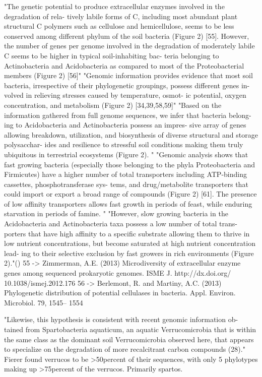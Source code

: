 "The genetic potential to produce extracellular enzymes involved in the degradation of rela- tively labile forms of C, including most abundant plant structural C polymers such as cellulose and hemicellulose, seems to be less conserved among different phylum of the soil bacteria (Figure 2) [55]. However, the number of genes per genome involved in the degradation of moderately labile C seems to be higher in typical soil-inhabiting bac- teria belonging to Actinobacteria and Acidobacteria as compared to most of the Proteobacterial members (Figure 2) [56]" "Genomic information provides evidence that most soil bacteria, irrespective of their phylogenetic groupings, possess different genes in- volved in relieving stresses caused by temperature, osmot- ic potential, oxygen concentration, and metabolism (Figure 2) [34,39,58,59]" 
"Based on the information gathered from full genome sequences, we infer that bacteria belong- ing to Acidobacteria and Actinobacteria possess an impres- sive array of genes allowing breakdown, utilization, and biosynthesis of diverse structural and storage polysacchar- ides and resilience to stressful soil conditions making them truly ubiquitous in terrestrial ecosystems (Figure 2). " "Genomic analysis shows that fast growing bacteria (especially those belonging to the phyla Proteobacteria and Firmicutes) have a higher number of total transporters including ATP-binding cassettes, phosphotransferase sys- tems, and drug/metabolite transporters that could import or export a broad range of compounds (Figure 2) [61]. The presence of low affinity transporters allows fast growth in periods of feast, while enduring starvation in periods of famine. "
"However, slow growing bacteria in the Acidobacteria and Actinobacteria taxa possess a low number of total trans- porters that have high affinity to a specific substrate allowing them to thrive in low nutrient concentrations, but become saturated at high nutrient concentration lead- ing to their selective exclusion by fast growers in rich environments (Figure 2)."(\cite{Trivedi_2013}) 55 -> Zimmerman, A.E. (2013) Microdiversity of extracellular enzyme genes among sequenced prokaryotic genomes. ISME J. http://dx.doi.org/ 10.1038/ismej.2012.176
56 -> Berlemont, R. and Martiny, A.C. (2013) Phylogenetic distribution of potential cellulases in bacteria. Appl. Environ. Microbiol. 79, 1545– 1554

"Likewise, this hypothesis is consistent with recent genomic information ob- tained from Spartobacteria aquaticum, an aquatic Verrucomicrobia that is within the same class as the dominant soil Verrucomicrobia observed here, that appears to specialize on the degradation of more recalcitrant carbon compounds (28)."  Fierer found verrucos to be >50percent of their sequences, with only 5 phylotypes making up >75percent of the verrucos.  Primarily spartos.  \cite{Fierer_2013} 

